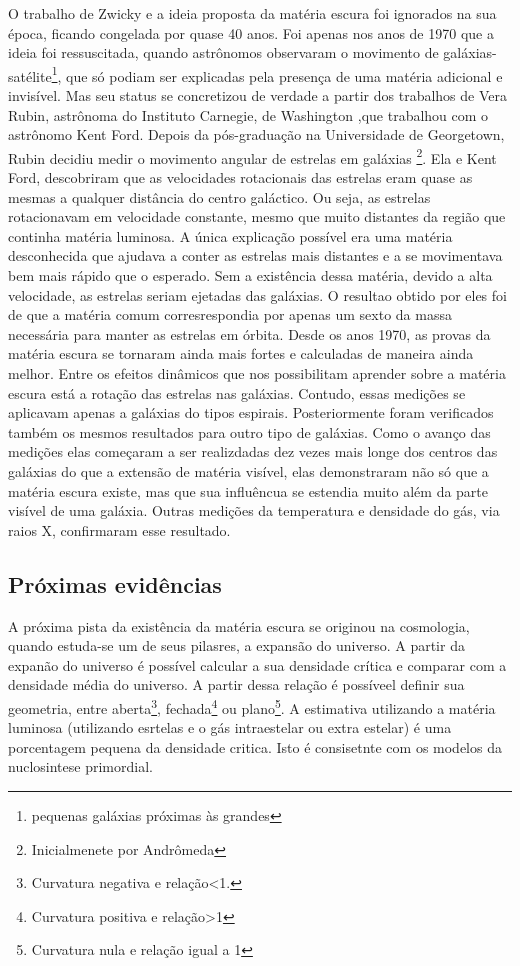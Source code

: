 \documentclass[
	article,			%
	11pt,				%
	twoside,			%
	a4paper,			%
	english,			%
	brazil,				%
	sumario=tradicional
	]{abntex2}
\begin{document}
O trabalho de Zwicky e a ideia proposta da matéria escura foi ignorados na sua época, ficando congelada por quase 40 anos. Foi apenas nos anos de 1970
que a ideia foi ressuscitada, quando astrônomos observaram o movimento de galáxias-satélite\footnote{pequenas
galáxias próximas às grandes}, que só podiam ser explicadas pela presença de uma matéria adicional e invisível.
Mas seu status se concretizou de verdade a partir dos trabalhos de Vera Rubin, astrônoma do Instituto Carnegie, de Washington ,que trabalhou com o astrônomo Kent Ford. Depois da pós-graduação na Universidade de Georgetown,
Rubin decidiu medir o movimento angular de estrelas em galáxias \footnote{Inicialmenete  por Andrômeda}.
Ela e Kent Ford, descobriram que as
velocidades rotacionais das estrelas eram quase as mesmas a qualquer distância
do centro galáctico. Ou seja, as estrelas rotacionavam em velocidade constante,
mesmo que muito distantes da região que continha matéria luminosa. A única
explicação possível era uma matéria desconhecida que ajudava a conter
as estrelas mais distantes e a se movimentava bem mais rápido que o esperado. Sem
a existência dessa matéria, devido a alta velocidade, as estrelas seriam ejetadas das galáxias. O resultao obtido por eles foi de
que a matéria comum corresrespondia por apenas um sexto da massa
necessária para manter as estrelas em órbita.
Desde os anos 1970, as provas da matéria escura se tornaram ainda mais fortes e calculadas de maneira ainda melhor.
Entre os efeitos dinâmicos que nos possibilitam aprender sobre a matéria escura está a rotação das estrelas nas galáxias.
Contudo, essas medições se aplicavam apenas a galáxias do tipos espirais. Posteriormente foram verificados também os mesmos resultados para outro tipo de galáxias.
Como o avanço das medições elas começaram a ser realizdadas dez vezes mais longe dos centros das galáxias do que a extensão de matéria visível, elas
demonstraram não só que a matéria escura existe, mas que sua influêncua se estendia
muito além da parte visível de uma galáxia. Outras medições da temperatura e densidade
do gás, via raios X, conﬁrmaram esse resultado.

\subsection{Próximas evidências}

A próxima pista da existência da matéria escura se originou na cosmologia, quando estuda-se um de seus pilasres, a expansão do universo.
A partir da expanão do universo é possível calcular a sua densidade crítica e comparar com a densidade média do universo. A partir dessa relação
é possíveel definir sua geometria, entre aberta\footnote{Curvatura negativa e relação<1.}, fechada\footnote{Curvatura positiva e relação>1} ou plano\footnote{Curvatura nula e relação igual a 1}.
A estimativa utilizando a matéria luminosa (utilizando esrtelas e o gás intraestelar ou extra estelar) é uma porcentagem pequena da densidade critica. Isto é consisetnte com os modelos da nuclosintese primordial.
\end{document}
